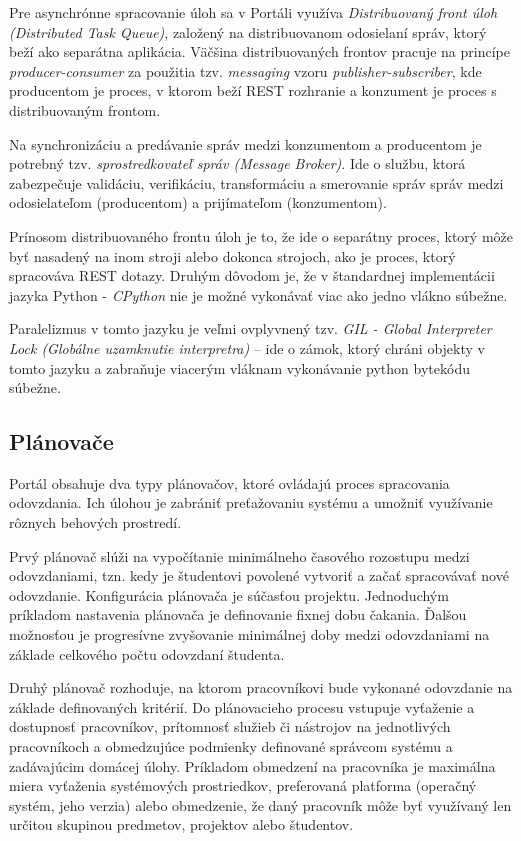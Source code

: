 \documentclass[
  digital, %
  twoside, %
  table,   %
  lof,     %
  lot,     %
]{fithesis3}
\begin{document}
Pre asynchrónne spracovanie úloh sa v Portáli využíva \emph{Distribuovaný front úloh (Distributed Task Queue)}, založený na distribuovanom odosielaní správ, ktorý beží ako separátna aplikácia. Väčšina distribuovaných frontov pracuje na princípe \emph{producer-consumer} za použitia tzv. \emph{messaging} vzoru \emph{publisher-subscriber}\cite{ethomas-soa}, kde producentom je proces, v ktorom beží REST rozhranie a konzument je proces s distribuovaným frontom. 

Na synchronizáciu a predávanie správ medzi konzumentom a producentom je potrebný tzv. \emph{sprostredkovateľ správ (Message Broker)}. Ide o službu, ktorá zabezpečuje validáciu, verifikáciu, transformáciu a smerovanie správ správ medzi odosielateľom (producentom) a prijímateľom (konzumentom)\cite{mom}.

Prínosom distribuovaného frontu úloh je to, že ide o separátny proces, ktorý môže byť nasadený na inom stroji alebo dokonca strojoch, ako je proces, ktorý spracováva REST dotazy. Druhým dôvodom je, že v štandardnej implementácii jazyka Python - \emph{CPython} nie je možné vykonávať viac ako jedno vlákno súbežne.

Paralelizmus v tomto jazyku je veľmi ovplyvnený tzv. \emph{GIL - Global Interpreter Lock (Globálne uzamknutie interpretra)} -- ide o zámok, ktorý chráni objekty v tomto jazyku a zabraňuje viacerým vláknam vykonávanie python bytekódu súbežne\cite{cpython-gil}.

\subsection{Plánovače}
\label{portal-scheduler}

Portál obsahuje dva typy plánovačov, ktoré ovládajú proces spracovania odovzdania. Ich úlohou je zabrániť preťažovaniu systému a umožniť využívanie rôznych behových prostredí.

Prvý plánovač slúži na vypočítanie minimálneho časového rozostupu medzi odovzdaniami, tzn. kedy je študentovi povolené vytvoriť a začať spracovávať nové odovzdanie. Konfigurácia plánovača je súčasťou projektu. Jednoduchým príkladom nastavenia plánovača je definovanie fixnej dobu čakania. Ďalšou možnosťou je progresívne zvyšovanie minimálnej doby medzi odovzdaniami na základe celkového počtu odovzdaní študenta.

Druhý plánovač rozhoduje, na ktorom pracovníkovi bude vykonané odovzdanie na základe definovaných kritérií. Do plánovacieho procesu vstupuje vyťaženie a dostupnosť pracovníkov, prítomnosť služieb či nástrojov na jednotlivých pracovníkoch a obmedzujúce podmienky definované správcom systému a zadávajúcim domácej úlohy. Príkladom obmedzení na pracovníka je maximálna miera vyťaženia systémových prostriedkov, preferovaná platforma (operačný systém, jeho verzia) alebo obmedzenie, že daný pracovník môže byť využívaný len určitou skupinou predmetov, projektov alebo študentov. 
\end{document}
